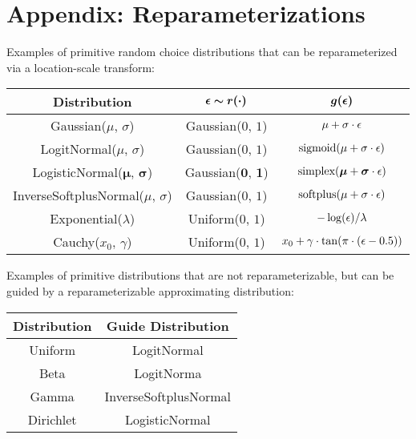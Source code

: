 \section{Appendix: Reparameterizations}
\label{sec:appendix_reparam}

Examples of primitive random choice distributions that can be reparameterized via a location-scale transform:

\begin{center}
\renewcommand{\arraystretch}{1.5}
\begin{tabular}{c | c | c}
\textbf{Distribution} & $\bm{\epsilon \sim r(\cdot)}$ & $\bm{g(\epsilon)}$ \\
\hline
Gaussian($\mu$, $\sigma$) & Gaussian($0$, $1$) & $\mu + \sigma \cdot \epsilon$ \\
LogitNormal($\mu$, $\sigma$) & Gaussian($0$, $1$) & $\text{sigmoid}(\mu + \sigma \cdot \epsilon)$ \\
LogisticNormal($\bm{\mu}$, $\bm{\sigma}$) & Gaussian($\bm{0}$, $\bm{1}$) & $\text{simplex}(\bm{\mu} + \bm{\sigma} \cdot \epsilon)$ \\
InverseSoftplusNormal($\mu$, $\sigma$) & Gaussian($0$, $1$) & $\text{softplus}(\mu + \sigma \cdot \epsilon)$ \\
Exponential($\lambda$) & Uniform($0$, $1$) & $-\log(\epsilon) / \lambda$ \\
Cauchy($x_0$, $\gamma$) & Uniform($0$, $1$) & $x_0 + \gamma \cdot \tan( \pi \cdot (\epsilon - 0.5) )$
\end{tabular}
\end{center}

Examples of primitive distributions that are not reparameterizable, but can be guided by a reparameterizable approximating distribution:

\begin{center}
\renewcommand{\arraystretch}{1.5}
\begin{tabular}{c | c}
\textbf{Distribution} & \textbf{Guide Distribution} \\
\hline
Uniform & LogitNormal \\
Beta & LogitNorma \\
Gamma & InverseSoftplusNormal \\
Dirichlet & LogisticNormal
\end{tabular}
\end{center}
